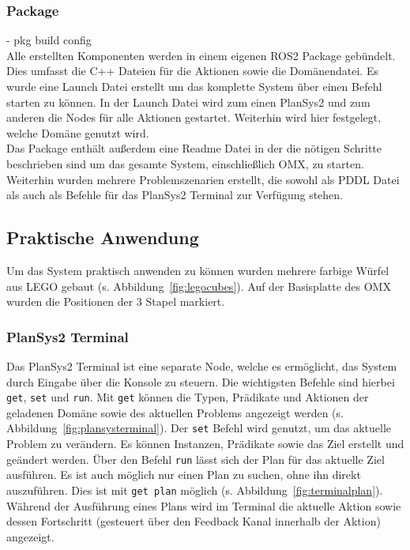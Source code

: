 \subsubsection{Package}
- pkg build config\\
Alle erstellten Komponenten werden in einem eigenen \ac{ROS2} Package gebündelt.
Dies umfasst die C++ Dateien für die Aktionen sowie die Domänendatei.
Es wurde eine Launch Datei erstellt um das komplette System über einen Befehl starten zu können.
In der Launch Datei wird zum einen \ac{PlanSys2} und zum anderen die Nodes für alle Aktionen gestartet.
Weiterhin wird hier festgelegt, welche Domäne genutzt wird.\\
Das Package enthält außerdem eine Readme Datei in der die nötigen Schritte beschrieben sind um das gesamte System, einschließlich OMX, zu starten.
Weiterhin wurden mehrere Problemszenarien erstellt, die sowohl als \ac{PDDL} Datei als auch als Befehle für das \ac{PlanSys2} Terminal zur Verfügung stehen.

\subsection{Praktische Anwendung}
Um das System praktisch anwenden zu können wurden mehrere farbige Würfel aus LEGO gebaut (s. Abbildung~\ref{fig:legocubes}).
Auf der Basisplatte des OMX wurden die Positionen der 3 Stapel markiert.
\subsubsection{PlanSys2 Terminal}
Das \ac{PlanSys2} Terminal ist eine separate Node, welche es ermöglicht, das System durch Eingabe über die Konsole zu steuern.
Die wichtigsten Befehle sind hierbei \verb|get|, \verb|set| und \verb|run|.
Mit \verb|get| können die Typen, Prädikate und Aktionen der geladenen Domäne sowie des aktuellen Problems angezeigt werden (s. Abbildung~\ref{fig:plansysterminal}).
Der \verb|set| Befehl wird genutzt, um das aktuelle Problem zu verändern.
Es können Instanzen, Prädikate sowie das Ziel erstellt und geändert werden.
Über den Befehl \verb|run| lässt sich der Plan für das aktuelle Ziel ausführen.
Es ist auch möglich nur einen Plan zu suchen, ohne ihn direkt auszuführen.
Dies ist mit \verb|get plan| möglich (s. Abbildung~\ref{fig:terminalplan}).\\
Während der Ausführung eines Plans wird im Terminal die aktuelle Aktion sowie dessen Fortschritt (gesteuert über den Feedback Kanal innerhalb der Aktion) angezeigt.
